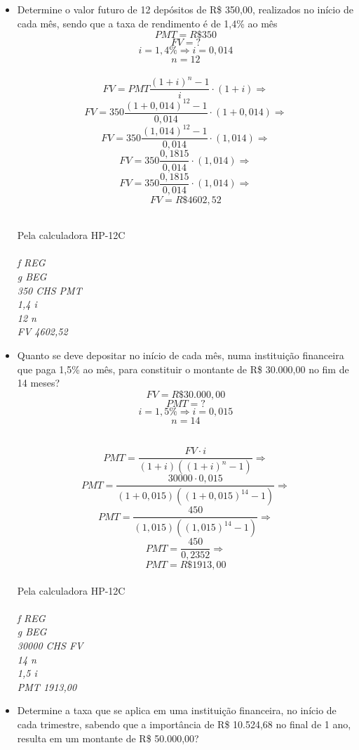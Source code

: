 \documentclass[a4paper, 12pt]{article}
\begin{document}
\begin{itemize}

\item Determine  o  valor  futuro  de  12  depósitos  de  R\$  350,00,  realizados  no início de cada mês, sendo que a taxa de rendimento é de 1,4\% ao mês
$$ PMT = R\$350 $$
$$ FV = ? $$
$$ i = 1,4\% \Rightarrow i = 0,014 $$
$$ n = 12 $$
\\
$$ FV = PMT\frac{(1+i)^{n}-1}{i}\cdot(1+i) \Rightarrow $$
$$ FV = 350\frac{(1+0,014)^{12}-1}{0,014}\cdot(1+0,014) \Rightarrow $$
$$ FV = 350\frac{(1,014)^{12}-1}{0,014}\cdot(1,014) \Rightarrow $$
$$ FV = 350\frac{0,1815}{0,014}\cdot(1,014) \Rightarrow $$
$$ FV = 350\frac{0,1815}{0,014}\cdot(1,014) \Rightarrow $$
$$ \boxed{FV = R\$4602,52} $$

\\

Pela calculadora HP-12C\\\\
\emph{f REG}\\
\emph{g BEG}\\
\emph{350 CHS PMT}\\
\emph{1,4 i}\\
\emph{12 n}\\
\emph{FV 4602,52}

\item Quanto se deve depositar no início de cada mês, numa instituição financeira que paga 1,5\% ao mês, para constituir o montante de R\$ 30.000,00 no fim de 14 meses?\\
  
$$ FV = R\$30.000,00 $$
$$ PMT = ? $$  
$$ i = 1,5\% \Rightarrow i = 0,015 $$
$$ n = 14 $$

\\
$$ PMT = \frac{FV\cdot i}{(1+i)((1+i)^{n}-1)} \Rightarrow $$
$$ PMT = \frac{30000\cdot 0,015}{(1+0,015)((1+0,015)^{14}-1)} \Rightarrow $$
$$ PMT = \frac{450}{(1,015)((1,015)^{14}-1)} \Rightarrow $$
$$ PMT = \frac{450}{0,2352} \Rightarrow $$
$$ \boxed{PMT = R\$1913,00} $$
\\
Pela calculadora HP-12C\\\\
\emph{f REG}\\
\emph{g BEG}\\
\emph{30000 CHS FV}\\
\emph{14 n}\\
\emph{1,5 i}\\
\emph{PMT 1913,00}  

\item Determine a taxa que se aplica em uma instituição financeira, no início de cada trimestre, sabendo que a importância de R\$ 10.524,68 no final de 1 ano, resulta em um montante de R\$ 50.000,00? \\
  

\end{itemize}
\end{document}

